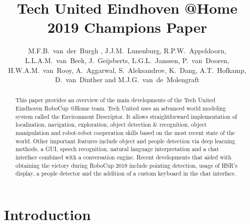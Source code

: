 \documentclass[runningheads,a4paper]{llncs}
\begin{document}

\title{Tech United Eindhoven @Home \\2019 Champions Paper}


\author{M.F.B.~van~der~Burgh , J.J.M.~Lunenburg,  R.P.W.~Appeldoorn, L.L.A.M.~van~Beek,
J.~Geijsberts, L.G.L.~Janssen, P.~van~Dooren, 
H.W.A.M.~van~Rooy, A.~Aggarwal, S.~Aleksandrov, K.~Dang, A.T.~Hofkamp, D.~van~Dinther and M.J.G.~van~de~Molengraft}




\maketitle
%
%
%
\begin{abstract}
This paper provides an overview of the main developments of the Tech United Eindhoven RoboCup @Home team. Tech United uses an advanced world modeling system called the Environment Descriptor. It allows straightforward implementation of localization, navigation, exploration, object detection \& recognition, object manipulation and robot-robot cooperation skills based on the most recent state of the world. Other important features include object and people detection via deep learning methods, a GUI, speech recognition, natural language interpretation and a chat interface combined with a conversation engine. Recent developments that aided with obtaining the victory during RoboCup 2019 include pointing detection, usage of HSR's display, a people detector and the addition of a custom keyboard in the chat interface.

\end{abstract}
%
%
%

\section{Introduction}

\end{document}

